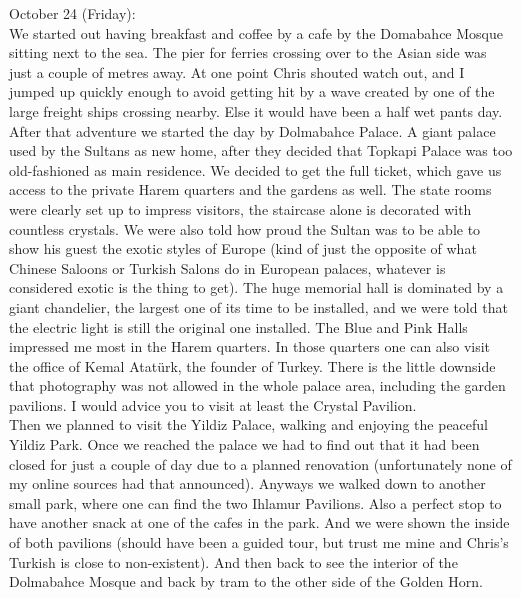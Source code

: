 October 24 (Friday):\\
We started out having breakfast and coffee by a cafe by the Domabahce Mosque sitting next to the sea. The pier for ferries crossing over to the Asian side was just a couple of metres away. At one point Chris shouted watch out, and I jumped up quickly enough to avoid getting hit by a wave created by one of the large freight ships crossing nearby. Else it would have been a half wet pants day. After that adventure we started the day by Dolmabahce Palace. A giant palace used by the Sultans as new home, after they decided that Topkapi Palace was too old-fashioned as main residence. We decided to get the full ticket, which gave us access to the private Harem quarters and the gardens as well. The state rooms were clearly set up to impress visitors, the staircase alone is decorated with countless crystals. We were also told how proud the Sultan was to be able to show his guest the exotic styles of Europe (kind of just the opposite of what Chinese Saloons or Turkish Salons do in European palaces, whatever is considered exotic is the thing to get). The huge memorial hall is dominated by a giant chandelier, the largest one of its time to be installed, and we were told that the electric light is still the original one installed. The Blue and Pink Halls impressed me most in the Harem quarters. In those quarters one can also visit the office of Kemal Atat\"urk, the founder of Turkey. There is the little downside that photography was not allowed in the whole palace area, including the garden pavilions. I would advice you to visit at least the Crystal Pavilion.\\
Then we planned to visit the Yildiz Palace, walking and enjoying the peaceful Yildiz Park. Once we reached the palace we had to find out that it had been closed for just a couple of day due to a planned renovation (unfortunately none of my online sources had that announced). Anyways we walked down to another small park, where one can find the two Ihlamur Pavilions. Also a perfect stop to have another snack at one of the cafes in the park. And we were shown the inside of both pavilions (should have been a guided tour, but trust me mine and Chris's Turkish is close to non-existent). And then back to see the interior of the Dolmabahce Mosque and back by tram to the other side of the Golden Horn.\\

